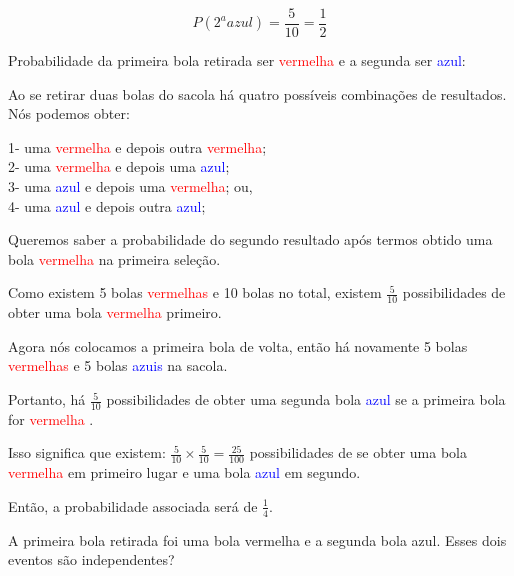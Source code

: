 \documentclass[
]{book}
\begin{document}
\hfill\break

\[
P(2^{a} azul)= \frac{5}{10}= \frac{1}{2}
\]

\hfill\break

Probabilidade da primeira bola retirada ser \textcolor{red}{vermelha} e a segunda ser \textcolor{blue}{azul}:

\hfill\break

Ao se retirar duas bolas do sacola há quatro possíveis combinações de resultados. Nós podemos obter:

\hfill\break

1- uma \textcolor{red}{vermelha} e depois outra \textcolor{red}{vermelha};\\
2- uma \textcolor{red}{vermelha} e depois uma \textcolor{blue}{azul};\\
3- uma \textcolor{blue}{azul} e depois uma \textcolor{red}{vermelha}; ou,\\
4- uma \textcolor{blue}{azul} e depois outra \textcolor{blue}{azul};

\hfill\break

Queremos saber a probabilidade do segundo resultado após termos obtido uma bola \textcolor{red}{vermelha} na primeira seleção.

\hfill\break

Como existem 5 bolas \textcolor{red}{vermelhas} e 10 bolas no total, existem \(\frac{5}{10}\) possibilidades de obter uma bola \textcolor{red}{vermelha} primeiro.

\hfill\break

Agora nós colocamos a primeira bola de volta, então há novamente 5 bolas \textcolor{red}{vermelhas} e 5 bolas \textcolor{blue}{azuis} na sacola.

\hfill\break

Portanto, há \(\frac{5}{10}\) possibilidades de obter uma segunda bola \textcolor{blue}{azul} se a primeira bola for \textcolor{red}{vermelha} .

\hfill\break

Isso significa que existem: \(\frac{5}{10} \times \frac{5}{10}= \frac{25}{100}\) possibilidades de se obter uma bola \textcolor{red}{vermelha} em primeiro lugar e uma bola \textcolor{blue}{azul} em segundo.

\hfill\break

Então, a probabilidade associada será de \(\frac{1}{4}\).

\hfill\break

A primeira bola retirada foi uma bola vermelha e a segunda bola azul. Esses dois eventos são independentes?
\end{document}
